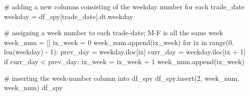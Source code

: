 \documentclass[
  letterpaper,
  DIV=11,
  numbers=noendperiod]{scrreprt}
\newenvironment{Shaded}{\begin{snugshade}}{\end{snugshade}}
\newcommand{\BuiltInTok}[1]{\textcolor[rgb]{0.00,0.23,0.31}{#1}}
\newcommand{\CommentTok}[1]{\textcolor[rgb]{0.37,0.37,0.37}{#1}}
\newcommand{\ControlFlowTok}[1]{\textcolor[rgb]{0.00,0.23,0.31}{#1}}
\newcommand{\DecValTok}[1]{\textcolor[rgb]{0.68,0.00,0.00}{#1}}
\newcommand{\KeywordTok}[1]{\textcolor[rgb]{0.00,0.23,0.31}{#1}}
\newcommand{\NormalTok}[1]{\textcolor[rgb]{0.00,0.23,0.31}{#1}}
\newcommand{\OperatorTok}[1]{\textcolor[rgb]{0.37,0.37,0.37}{#1}}
\newcommand{\StringTok}[1]{\textcolor[rgb]{0.13,0.47,0.30}{#1}}
\begin{document}
\begin{Shaded}
\begin{Highlighting}[]
\CommentTok{\# adding a new columns consisting of the weekday number for each trade\_date }
\NormalTok{weekday }\OperatorTok{=}\NormalTok{ df\_spy[}\StringTok{\textquotesingle{}trade\_date\textquotesingle{}}\NormalTok{].dt.weekday}

\CommentTok{\# assigning a week number to each trade{-}date; M{-}F is all the same week}
\NormalTok{week\_num }\OperatorTok{=}\NormalTok{ []}
\NormalTok{ix\_week }\OperatorTok{=} \DecValTok{0}
\NormalTok{week\_num.append(ix\_week)}
\ControlFlowTok{for}\NormalTok{ ix }\KeywordTok{in} \BuiltInTok{range}\NormalTok{(}\DecValTok{0}\NormalTok{, }\BuiltInTok{len}\NormalTok{(weekday) }\OperatorTok{{-}} \DecValTok{1}\NormalTok{):}
\NormalTok{    prev\_day }\OperatorTok{=}\NormalTok{ weekday.iloc[ix]}
\NormalTok{    curr\_day }\OperatorTok{=}\NormalTok{ weekday.iloc[ix }\OperatorTok{+} \DecValTok{1}\NormalTok{]}
    \ControlFlowTok{if}\NormalTok{ curr\_day }\OperatorTok{\textless{}}\NormalTok{ prev\_day:}
\NormalTok{        ix\_week }\OperatorTok{=}\NormalTok{ ix\_week }\OperatorTok{+} \DecValTok{1}
\NormalTok{    week\_num.append(ix\_week)}

\CommentTok{\# inserting the week{-}number column into df\_spy}
\NormalTok{df\_spy.insert(}\DecValTok{2}\NormalTok{, }\StringTok{\textquotesingle{}week\_num\textquotesingle{}}\NormalTok{, week\_num)}
\NormalTok{df\_spy}
\end{Highlighting}
\end{Shaded}
\end{document}
